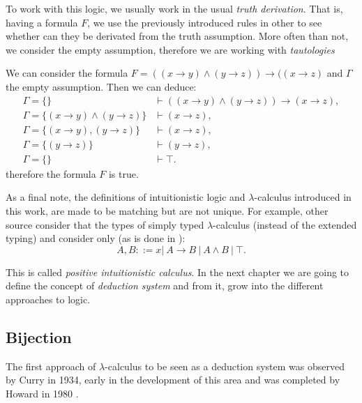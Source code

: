 To work with this logic, we usually work in the usual \emph{truth derivation}. That is, having a formula $F$, we use the previously introduced rules in other to see whether can they be derivated from the truth assumption. More often than not, we consider the empty assumption, therefore we are working with \emph{tautologies}

\begin{example}
  We can consider the formula $F=((x\to y) \land (y\to z)) \to ((x \to z)$ and $\Gamma$ the empty assumption. Then we can deduce:
  \begin{align*}
    \Gamma=\{\}& \vdash    ((x\to y) \land (y\to z)) \to (x\to z),\\
    \Gamma=\{(x\to y)\land (y\to z)\} & \vdash    (x \to z),\\
    \Gamma=\{(x\to y), (y\to z)\} & \vdash    (x \to z),\\
    \Gamma=\{ (y\to z)\} & \vdash    (y \to z),\\
    \Gamma=\{\} & \vdash \top.
  \end{align*}
  therefore the formula $F$ is true.
\end{example}





As a final note, the definitions of intuitionistic logic and $\lambda$-calculus introduced in this work, are made to be matching but are not unique. For example, other source consider that the types of simply typed $\lambda$-calculus (instead of the extended typing) and consider only (as is done in \cite[Section 6.5]{selinger2008lecture}):
$$A,B ::= x |\ A\to B\ |\ A \land B \ |\ \top .$$

This is called \emph{positive intuitionistic calculus}. In the next chapter we are going to define the concept of \emph{deduction system} and from it, grow into the different approaches to logic.



\subsection{Bijection}
The first approach of $\lambda$-calculus to be seen as a deduction system was observed by Curry in 1934\cite{curry1934functionality}, early in the development of this area and was completed by Howard in 1980 \cite{howard1980formulae}. \\%


